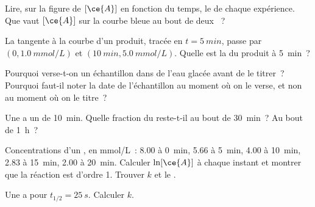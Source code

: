 \begin{exercise}[$\star$]\label{exo:g12:reaction-rates:2}
Lire, sur la figure de $[\ce{A}]$ en fonction du temps, le  de chaque expérience.
Que vaut $[\ce{A}]$ sur la courbe bleue au bout de deux ~?
\end{exercise}

\begin{exercise}[$\star$]\label{exo:g12:reaction-rates:3}
La tangente à la courbe d'un produit, tracée en $t = \qty{5}{min}$,
passe par
$(0, \qty{1.0}{mmol/L})$ et $(\qty{10}{min}, \qty{5.0}{mmol/L})$.
Quelle est la  du produit à \qty{5}{min}~?
\end{exercise}

\begin{exercise}[$\star$]\label{exo:g12:reaction-rates:4}
Pourquoi verse-t-on un échantillon dans de l'eau glacée avant de le
titrer~? Pourquoi faut-il noter la date de l'échantillon au moment où
on le verse, et non au moment où on le titre~?
\end{exercise}

\begin{exercise}[$\star$]\label{exo:g12:reaction-rates:5}
Une  a un  de \qty{10}{min}.
Quelle fraction du  reste-t-il au bout de \qty{30}{min}~? Au bout
de \qty{1}{h}~?
\end{exercise}

\begin{exercise}[$\star\star$]\label{exo:g12:reaction-rates:6}
Concentrations d'un , en \si{mmol/L}~: 8.00 à \qty{0}{min}, 5.66
à \qty{5}{min}, 4.00 à \qty{10}{min}, 2.83 à \qty{15}{min}, 2.00 à
\qty{20}{min}. Calculer $\ln[\ce{A}]$ à chaque instant et montrer que la
réaction est d'ordre 1. Trouver $k$ et le .
\end{exercise}

\begin{exercise}[$\star\star$]\label{exo:g12:reaction-rates:7}
Une  a pour 
$t_{1/2} = \qty{25}{s}$. Calculer $k$.
\end{exercise}

